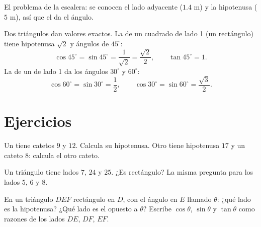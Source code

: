 \begin{omfigure}

{\small El problema de la escalera: se conocen el lado adyacente ($1.4$ m) y la
hipotenusa ($5$ m), así que el  da el ángulo.}
\end{omfigure}

\begin{example}\label{ex:g9:trig:special}
Dos triángulos dan valores exactos. La  de un cuadrado de lado 1 (un
 rectángulo) tiene hipotenusa $\sqrt2$ y ángulos de $45^\circ$:
\[
\cos 45^\circ = \sin 45^\circ = \frac{1}{\sqrt2} = \frac{\sqrt2}{2},
\qquad \tan 45^\circ = 1 .
\]
La  de un  de lado 1 da los ángulos $30^\circ$ y
$60^\circ$:
\[
\cos 60^\circ = \sin 30^\circ = \frac12,
\qquad
\cos 30^\circ = \sin 60^\circ = \frac{\sqrt3}{2}.
\]
\end{example}

\section{Ejercicios}

\begin{exercise}[$\star$]\label{exo:g9:trig:1}
Un  tiene catetos $9$ y $12$. Calcula su hipotenusa. Otro
tiene hipotenusa $17$ y un cateto $8$: calcula el otro cateto.
\end{exercise}

\begin{exercise}[$\star$]\label{exo:g9:trig:2}
Un triángulo tiene lados $7$, $24$ y $25$. ¿Es rectángulo? La misma
pregunta para los lados $5$, $6$ y $8$.
\end{exercise}

\begin{exercise}[$\star$]\label{exo:g9:trig:3}
En un triángulo $DEF$ rectángulo en $D$, con el ángulo en $E$ llamado
$\theta$: ¿qué lado es la hipotenusa? ¿Qué lado es el opuesto a
$\theta$? Escribe $\cos\theta$, $\sin\theta$ y $\tan\theta$ como razones de
los lados $DE$, $DF$, $EF$.
\end{exercise}

